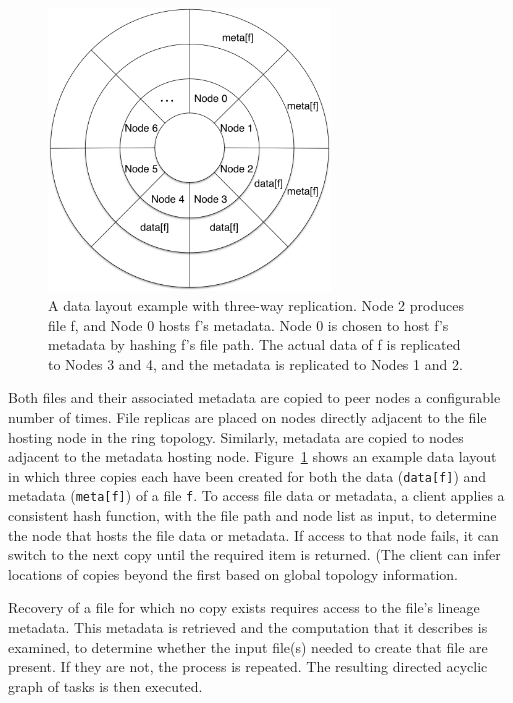 \documentclass{sig-alternate}
\begin{document}
\begin{figure}[ht]
	\begin{center}
		\includegraphics[width=75mm]{pictures/datalayout}
		\caption{A data layout example with three-way replication. Node 2 produces file f, and Node 0 hosts f's
		metadata. Node 0 is chosen to host f's metadata by hashing f's file path. The actual data of f is replicated to Nodes 3 and 4, and the metadata is replicated
		to Nodes 1 and 2.
		\label{fig:datalayout}}
  	\end{center}
\end{figure}

Both files and their associated metadata are copied to peer nodes a configurable number of times.
File replicas are placed on nodes directly adjacent to the file hosting node in the ring topology.
Similarly, metadata are copied to nodes adjacent to the metadata hosting node.
Figure~\ref{fig:datalayout} shows an example data layout in which three copies each have been
created for both the data ({\tt data[f]}) and metadata ({\tt meta[f]}) of a file {\tt f}.
To access file data or metadata, a client applies a consistent hash function, with the file path and node list as input, to determine the node that hosts the file data or metadata. If access to that node fails, it can switch to the next copy until the required item is returned. (The client can infer locations of copies beyond the first based on global topology information.

Recovery of a file for which no copy exists requires access to the file's lineage metadata.
This metadata is retrieved and the computation that it describes is examined, to
determine whether the input file(s) needed to create that file are present. If they are not, the process is repeated.
The resulting directed acyclic graph of tasks is then executed.
\end{document}
